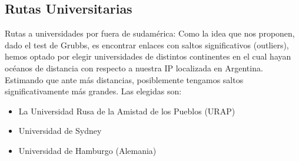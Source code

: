 \subsection{Rutas Universitarias} 

Rutas a universidades por fuera de sudam\'erica: Como la idea que nos proponen, dado el test de Grubbs, es encontrar enlaces con saltos significativos (outliers), hemos optado por elegir universidades de distintos continentes en el cual hayan oc\'eanos de distancia con respecto a nuestra IP localizada en Argentina. Estimando que ante m\'as distancias, posiblemente tengamos saltos significativamente m\'as grandes. Las elegidas son:

\begin{itemize}
\item La Universidad Rusa de la Amistad de los Pueblos (URAP)
\item Universidad de Sydney
\item Universidad de Hamburgo (Alemania)
\end{itemize}